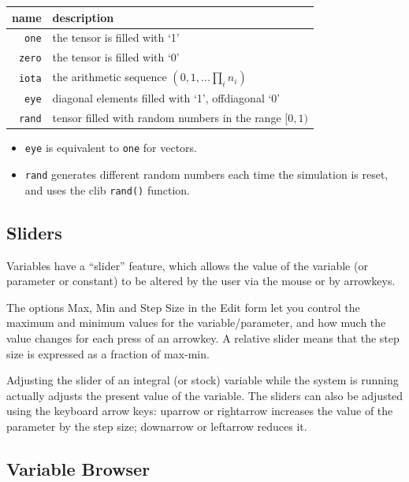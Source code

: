 \begin{tabular}{|r|l|}
\hline 
name  & description\tabularnewline
\hline 
\verb+one+ & the tensor is filled with `1'\tabularnewline
\verb+zero+ & the tensor is filled with `0'\tabularnewline
\verb+iota+ & the arithmetic sequence $(0,1,...\prod_{i}n_{i})$\tabularnewline
\verb+eye+ & diagonal elements filled with `1', offdiagonal `0'\tabularnewline
\verb+rand+ & tensor filled with random numbers in the range $[0,1)$\tabularnewline
\hline 
\end{tabular}
\begin{itemize}
\item \verb+eye+ is equivalent to \verb+one+ for vectors. 
\item \verb+rand+ generates different random numbers each time the simulation
is reset, and uses the clib \verb+rand()+ function. 
\end{itemize}

\subsection{Sliders}

Variables have a ``slider'' feature, which allows the value of the
variable (or parameter or constant) to be altered by the user via
the mouse or by arrowkeys.

The options Max, Min and Step Size in the Edit form let you control
the maximum and minimum values for the variable/parameter, and how
much the value changes for each press of an arrowkey. A relative slider
means that the step size is expressed as a fraction of max-min.

Adjusting the slider of an integral (or stock) variable while the
system is running actually adjusts the present value of the variable.
The sliders can also be adjusted using the keyboard arrow keys: uparrow
\textuparrow{} or rightarrow \textrightarrow{} increases the value
of the parameter by the step size; downarrow \textdownarrow or leftarrow
\textleftarrow{} reduces it.

\subsection{Variable Browser}

\label{VariableBrowser}

